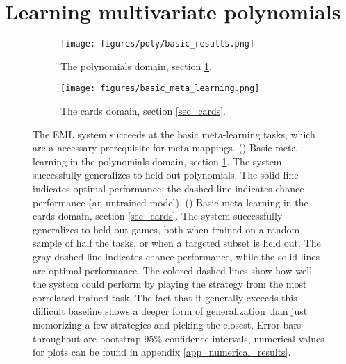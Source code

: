 \documentclass{article}
\begin{document}
\section{Learning multivariate polynomials} \label{sec_poly}
\begin{figure}
\centering
\begin{subfigure}[t]{0.5\textwidth}
\texttt{[image: figures/poly/basic\_results.png]}
\caption{The polynomials domain, section \ref{sec_poly}.}
\label{poly_basic_results}
\end{subfigure}%
\begin{subfigure}[t]{0.5\textwidth}
\texttt{[image: figures/basic\_meta\_learning.png]}
\caption{The cards domain, section \ref{sec_cards}.}
\label{cards_basic_results}
\end{subfigure}%
\caption{The EML system succeeds at the basic meta-learning tasks, which are a necessary prerequisite for meta-mappings. () Basic meta-learning in the polynomials domain, section \ref{sec_poly}. The system successfully generalizes to held out polynomials. The solid line indicates optimal performance; the dashed line indicates chance performance (an untrained model). () Basic meta-learning in the cards domain, section \ref{sec_cards}. The system successfully generalizes to held out games, both when trained on a random sample of half the tasks, or when a targeted subset is held out. The gray dashed line indicates chance performance, while the solid lines are optimal performance. The colored dashed lines show how well the system could perform by playing the strategy from the most correlated trained task. The fact that it generally exceeds this difficult baseline shows a deeper form of generalization than just memorizing a few strategies and picking the closest. Error-bars throughout are bootstrap 95\%-confidence intervals, numerical values for plots can be found in appendix \ref{app_numerical_results}.}
\end{figure}
\end{document}
